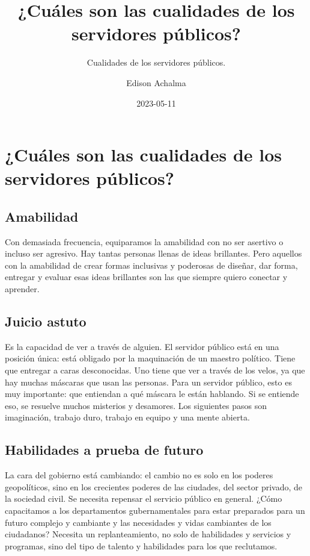 \documentclass[
  a4paper,
]{article}
\title{¿Cuáles son las cualidades de los servidores públicos?}
\subtitle{Cualidades de los servidores públicos.}
\author{Edison Achalma}
\date{2023-05-11}
\begin{document}
\maketitle

\section{¿Cuáles son las cualidades de los servidores
públicos?}\label{cuuxe1les-son-las-cualidades-de-los-servidores-puxfablicos}

\subsection{Amabilidad}\label{amabilidad}

Con demasiada frecuencia, equiparamos la amabilidad con no ser asertivo
o incluso ser agresivo. Hay tantas personas llenas de ideas brillantes.
Pero aquellos con la amabilidad de crear formas inclusivas y poderosas
de diseñar, dar forma, entregar y evaluar esas ideas brillantes son las
que siempre quiero conectar y aprender.

\subsection{Juicio astuto}\label{juicio-astuto}

Es la capacidad de ver a través de alguien. El servidor público está en
una posición única: está obligado por la maquinación de un maestro
político. Tiene que entregar a caras desconocidas. Uno tiene que ver a
través de los velos, ya que hay muchas máscaras que usan las personas.
Para un servidor público, esto es muy importante: que entiendan a qué
máscara le están hablando. Si se entiende eso, se resuelve muchos
misterios y desamores. Los siguientes pasos son imaginación, trabajo
duro, trabajo en equipo y una mente abierta.

\subsection{Habilidades a prueba de
futuro}\label{habilidades-a-prueba-de-futuro}

La cara del gobierno está cambiando: el cambio no es solo en los poderes
geopolíticos, sino en los crecientes poderes de las ciudades, del sector
privado, de la sociedad civil. Se necesita repensar el servicio público
en general. ¿Cómo capacitamos a los departamentos gubernamentales para
estar preparados para un futuro complejo y cambiante y las necesidades y
vidas cambiantes de los ciudadanos? Necesita un replanteamiento, no solo
de habilidades y servicios y programas, sino del tipo de talento y
habilidades para los que reclutamos.
\end{document}
